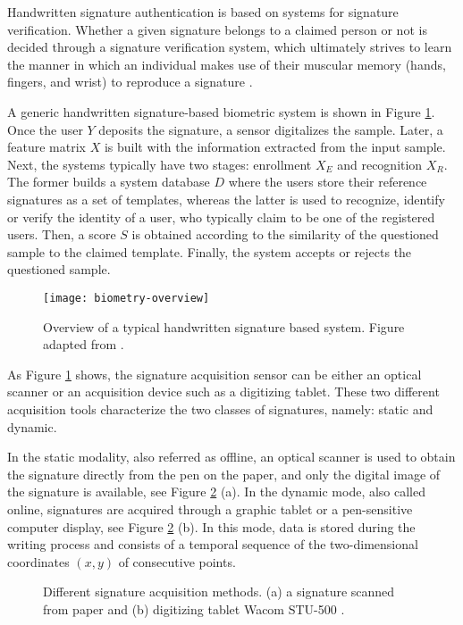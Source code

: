 Handwritten signature authentication is based on systems for signature verification. 
Whether a given signature belongs to a claimed person or not is decided through a signature verification system, which ultimately strives to learn the manner in which
an individual makes use of their muscular memory (hands,
fingers, and wrist) to reproduce a signature \cite{gupta1997review}. 

A generic handwritten signature-based biometric system is shown in Figure \ref{fig_ahsv-overview}. Once the user {\boldm $Y$} deposits the signature, a sensor digitalizes the sample. Later, a feature matrix {\boldm $X$} is built with the information extracted from the input sample. Next, the systems typically have two stages: enrollment {\boldm $X_{E}$} and recognition {\boldm $X_{R}$}. The former builds a system database {\boldm $D$} where the users store their reference signatures as a set of templates, whereas the latter is
used to recognize, identify or verify the identity of a user, who typically claim to be one of the registered users. Then, a score {\boldm $S$} is obtained according to the similarity of the
questioned sample to the claimed template. Finally, the system accepts or rejects the questioned sample.

\begin{figure}[!htb]
\centering
\texttt{[image: biometry-overview]}
\caption{Overview of a typical handwritten signature based system. Figure adapted from \cite{jain2016}.}
\label{fig_ahsv-overview}
\end{figure}

As Figure \ref{fig_ahsv-overview} shows, the signature acquisition sensor can be either an optical scanner or an acquisition device such as a digitizing tablet. These two different acquisition tools characterize the two classes of signatures, namely: static and dynamic. 

In the static modality, also referred as offline, an optical scanner is used to obtain the signature directly from the pen on the paper, and only the digital image of the signature is available, see Figure \ref{fig:acquisition} (a). In the dynamic mode, also called online, signatures are acquired through a graphic tablet or a pen-sensitive computer display, see Figure \ref{fig:acquisition} (b). In this mode, data is stored during the writing process and consists of a temporal sequence of the two-dimensional coordinates $(x, y)$ of consecutive points. 

\begin{figure}[!htpb]
\centering
\hspace*{0.5in} %
\caption{Different signature acquisition methods. (a) a signature scanned from paper and (b) digitizing tablet Wacom STU-500 \cite{wacom2016}. } \label{fig:acquisition}
\end{figure}

